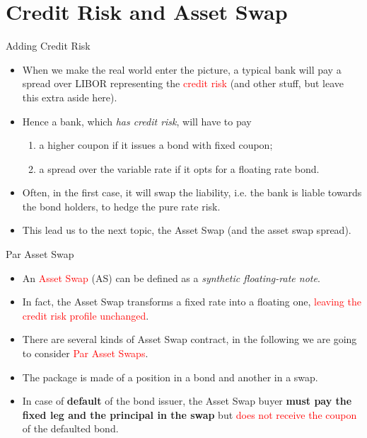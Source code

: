 \documentclass{beamer}
\begin{document}
\section{Credit Risk and Asset Swap}
\begin{frame}{Adding Credit Risk}
	\begin{itemize}
		\item When we make the real world enter the picture, a typical bank will pay a spread over LIBOR representing the \textcolor{red}{credit risk} (and other stuff, but leave this extra aside here). 
		\item<2-> Hence a bank, which \emph{has credit risk},  will have to pay
		\begin{enumerate}
			\item a higher coupon if it issues a bond with fixed coupon;
			\item a spread over the variable rate if it opts for a floating rate bond.
		\end{enumerate}
		\item<3-> Often, in the first case, it will swap the liability, i.e. the bank is liable towards the bond holders, to hedge the pure rate risk. 
		\item<4-> This lead us to the next topic, the Asset Swap (and the asset swap spread).
	\end{itemize}
\end{frame}

\begin{frame}{Par Asset Swap}
	\begin{itemize}
		\item<1-> An \textcolor{red}{Asset Swap} (AS) can be defined as a \emph{synthetic floating-rate note}.
		\item In fact, the Asset Swap transforms a fixed rate into a floating one, \textcolor{red}{leaving the credit risk profile unchanged}.
		\item<1-> There are several kinds of Asset Swap contract, in the following we are going to consider \textcolor{red}{Par Asset Swaps}. 
		\item<2-> The package is made of a position in a bond and another in a swap.
		\item<3-> In case of \textbf{default} of the bond issuer, the Asset Swap buyer \textbf{must pay the fixed leg and the principal in the swap} but \textcolor{red}{does not receive the coupon} of the defaulted bond. 
	\end{itemize}
\end{frame}
\end{document}
